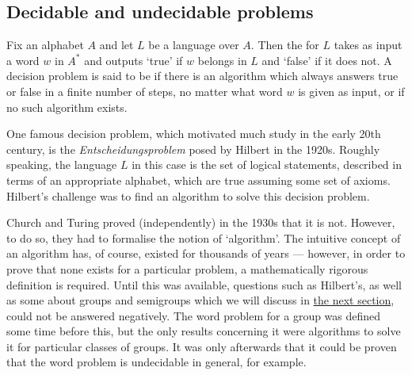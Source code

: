 \documentclass[noindex,noinsetproof,emphthm,12pt]{lmaths}
\begin{document}
\subsection{Decidable and undecidable problems}


Fix an alphabet $A$ and let $L$ be a language over $A$. Then the  for $L$ takes as input a word $w$ in $A^*$ and outputs `true' if $w$ belongs in $L$ and `false' if it does not. A decision problem is said to be  if there is an algorithm which always answers true or false in a finite number of steps, no matter what word $w$ is given as input, or  if no such algorithm exists.

One famous decision problem, which motivated much study in the early 20th century, is the \emph{Entscheidungsproblem} posed by Hilbert in the 1920s. Roughly speaking, the language $L$ in this case is the set of logical statements, described in terms of an appropriate alphabet, which are true assuming some set of axioms. Hilbert's challenge was to find an algorithm to solve this decision problem.

Church and Turing proved (independently) in the 1930s that it is not. However, to do so, they had to formalise the notion of `algorithm'. The intuitive concept of an algorithm has, of course, existed for thousands of years --- however, in order to prove that none exists for a particular problem, a mathematically rigorous definition is required. Until this was available, questions such as Hilbert's, as well as some about groups and semigroups which we will discuss in \hyperref[sec:word-problem]{the next section}, could not be answered negatively. The word problem for a group was defined some time before this, but the only results concerning it were algorithms to solve it for particular classes of groups. It was only afterwards that it could be proven that the word problem is undecidable in general, for example. 
\end{document}
